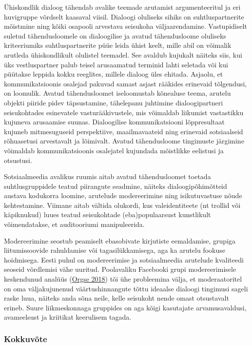\documentclass[estonian,]{article}
\begin{document}
Ühiskondlik dialoog tähendab avalike teemade arutamist argumenteeritul ja eri huvigruppe võrdselt kaasaval viisil. Dialoogi oluliseks sihiks on suhtluspartnerite mõistmine ning kõiki osapooli arvestava seisukoha väljaarendamine. Vastupidiselt suletud tähendusloomele on dialoogilise ja avatud tähendusloome oluliseks kriteeriumiks suhtluspartnerite püüe leida ühist keelt, mille abil on võimalik arutleda ühiskondlikult olulistel teemadel. See avaldub kujukalt näiteks siis, kui üks vestluspartner palub teisel arusaamatud terminid lahti seletada või kui püütakse leppida kokku reeglites, millele dialoog üles ehitada. Asjaolu, et kommunikatsioonis osalejad pakuvad samast asjast rääkides erinevaid tõlgendusi, on loomulik. Avatud tähendusloomet iseloomustab kõnealuse teema, arutelu objekti piiride pidev täpsustamine, tähelepanu juhtimine dialoogipartneri seisukohtades esinevatele vasturääkivustele, mis võimaldab liikumist vastastikku kujuneva arusaamise suunas. Dialoogilise kommunikatsiooni lõppresultaat kujuneb mitmesuguseid perspektiive, maailmavaateid ning erinevaid sotsiaalseid rõhuasetusi arvestavalt ja lõimivalt. Avatud tähendusloome tingimuste järgimine võimaldab kommunikatsioonis osalejatel kujundada mõistlikke eelistusi ja otsustusi.

Sotsiaalmeedia avalikus ruumis aitab avatud tähendusloomet toetada suhtlusgruppidele teatud piirangute seadmine, näiteks dialoogipõhimõtteid austava kodukorra loomine, arutelude modereerimine ning isikutuvastuse nõude kehtestamine. Viimane aitab vältida olukordi, kus valeidentiteete (nt trollid või käpiknukud) luues teatud seisukohtade (eba)populaarsust kunstlikult võimendatakse, et auditooriumi manipuleerida.

Modereerimine seostub peamiselt ebasobivate kirjutiste eemaldamise, grupiga liitumissoovide rahuldamise või tagasilükkamisega, aga ka arutelu fookuse hoidmisega. Eesti puhul on modereerimise ja sotsiaalmeedia arutelude kvaliteedi seoseid võrdlemisi vähe uuritud. Poolavaliku Facebooki grupi modereerimisele keskendunud analüüs (\protect\hyperlink{Orgse2018}{Orgse 2018}) tõi ühe probleemina välja, et moderaatoritel on oma väljakujunenud väärtushinnangute tõttu ideaalse dialoogi tingimusi sageli raske luua, näiteks anda sõna neile, kelle seisukoht nende omast otsustavalt erineb. Suure liikmeskonnaga gruppides on aga kõigi kasutajate arvamusavaldusi, avameelsust ja kriitikat keerulisem tagada.

\hypertarget{kokkuvuxf5te-11}{%
\subsubsection*{Kokkuvõte}\label{kokkuvuxf5te-11}}
\end{document}
